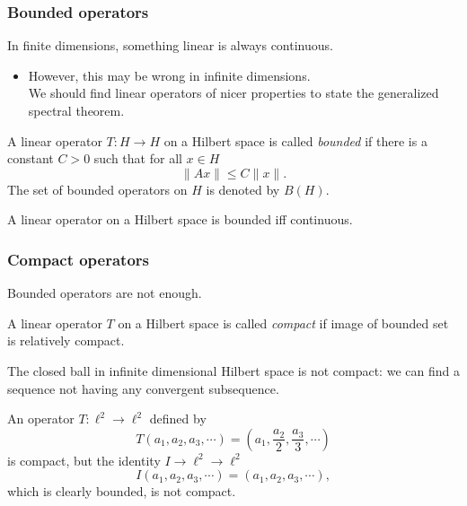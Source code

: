 \documentclass[10pt,handout]{beamer}
\begin{document}
\begin{frame}
\frametitle{Bounded operators}
  \begin{thm}[?]
    In finite dimensions, something linear is always continuous.
  \end{thm}
  \pause \begin{itemize} \item However, this may be wrong in infinite dimensions.\\ We should find linear operators of nicer properties to state the generalized spectral theorem.\end{itemize} \pause
  \begin{defn}
    A linear operator $T:H\to H$ on a Hilbert space is called \emph{bounded} if there is a constant $C>0$ such that for all $x\in H$
    \[\|Ax\|\le C\|x\|.\]
    The set of bounded operators on $H$ is denoted by $B(H)$.
  \end{defn}
  \pause
  \begin{thm}
    A linear operator on a Hilbert space is bounded iff continuous.
  \end{thm}
\end{frame}

\begin{frame}
\frametitle{Compact operators}
  Bounded operators are not enough.
  \begin{defn}
    A linear operator $T$ on a Hilbert space is called \emph{compact} if image of bounded set is relatively compact.
  \end{defn}
  \pause
  \begin{rmk}
    The closed ball in infinite dimensional Hilbert space is not compact: we can find a sequence not having any convergent subsequence.
  \end{rmk}
  \pause
  \begin{ex}
    An operator $T:\ell^2\to\ell^2$ defined by
    \[T(a_1,a_2,a_3,\cdots)=(a_1,\frac{a_2}2,\frac{a_3}3,\cdots)\]
    is compact, but the identity $I\to\ell^2\to\ell^2$
    \[I(a_1,a_2,a_3,\cdots)=(a_1,a_2,a_3,\cdots),\]
    which is clearly bounded, is not compact.
  \end{ex}
\end{frame}
\end{document}
